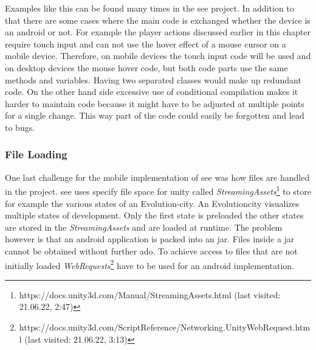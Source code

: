 Examples like this can be found many times in the \gls{see} project. 
In addition to that there are some cases where the main code is exchanged whether the device is an \gls{android} or not.
For example the player actions discussed earlier in this chapter require touch input and can not use the hover effect of a mouse cursor on a mobile device.
Therefore, on mobile devices the touch input code will be used and on desktop devices the mouse hover code, but both code parts use the same methods and variables.
Having two separated classes would make up redundant code. 
On the other hand side excessive use of conditional compilation makes it harder to maintain code because it might have to be adjusted at multiple points for a single change.
This way part of the code could easily be forgotten and lead to bugs.

\subsubsection{File Loading}
One last challenge for the mobile implementation of \gls{see} was how files are handled in the project.
\gls{see} uses specify file space for \gls{unity} called \textit{StreamingAssets}\footnote{https://docs.unity3d.com/Manual/StreamingAssets.html (last visited: 21.06.22, 2:47)} to store for example the various states of an Evolution-\gls{city}.
An Evolution\gls{city} visualizes multiple states of development.
Only the first state is preloaded the other states are stored in the \textit{StreamingAssets} and are loaded at runtime. 
The problem however is that an \gls{android} application is packed into an \gls{jar}.
Files inside a \gls{jar} cannot be obtained without further ado.
To achieve access to files that are not initially loaded \textit{WebRequests}\footnote{https://docs.unity3d.com/ScriptReference/Networking.UnityWebRequest.html (last visited: 21.06.22, 3:13)} have to be used for an \gls{android} implementation. 
